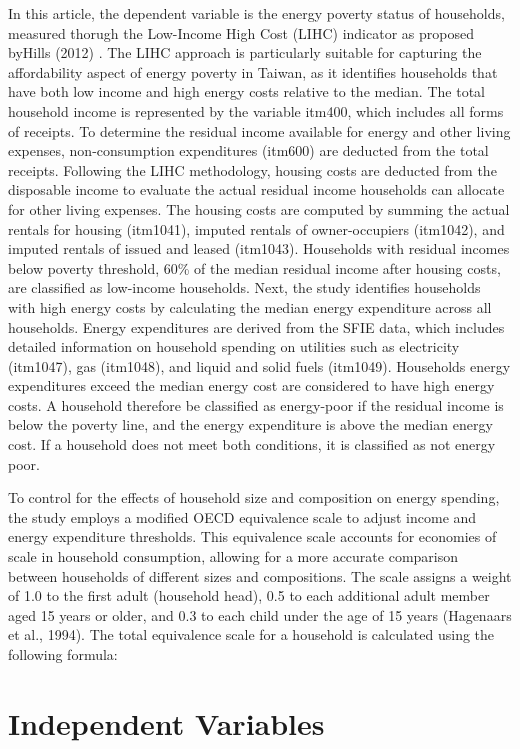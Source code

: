 \documentclass[
  twoside,
  openright,
  degree    = master,               %
  language  = english,              %
  fontset   = overleaf,             %
  watermark = true,                 %
  doi       = true,                 %
]{ntuthesis}
\begin{document}
In this article, the dependent variable is the energy poverty status of
households, measured thorugh the Low-Income High Cost (LIHC) indicator
as proposed byHills (2012) . The LIHC approach is particularly suitable
for capturing the affordability aspect of energy poverty in Taiwan, as
it identifies households that have both low income and high energy costs
relative to the median. The total household income is represented by the
variable itm400, which includes all forms of receipts. To determine the
residual income available for energy and other living expenses,
non-consumption expenditures (itm600) are deducted from the total
receipts. Following the LIHC methodology, housing costs are deducted
from the disposable income to evaluate the actual residual income
households can allocate for other living expenses. The housing costs are
computed by summing the actual rentals for housing (itm1041), imputed
rentals of owner-occupiers (itm1042), and imputed rentals of issued and
leased (itm1043). Households with residual incomes below poverty
threshold, 60\% of the median residual income after housing costs, are
classified as low-income households. Next, the study identifies
households with high energy costs by calculating the median energy
expenditure across all households. Energy expenditures are derived from
the SFIE data, which includes detailed information on household spending
on utilities such as electricity (itm1047), gas (itm1048), and liquid
and solid fuels (itm1049). Households energy expenditures exceed the
median energy cost are considered to have high energy costs. A household
therefore be classified as energy-poor if the residual income is below
the poverty line, and the energy expenditure is above the median energy
cost. If a household does not meet both conditions, it is classified as
not energy poor.

To control for the effects of household size and composition on energy
spending, the study employs a modified OECD equivalence scale to adjust
income and energy expenditure thresholds. This equivalence scale
accounts for economies of scale in household consumption, allowing for a
more accurate comparison between households of different sizes and
compositions. The scale assigns a weight of 1.0 to the first adult
(household head), 0.5 to each additional adult member aged 15 years or
older, and 0.3 to each child under the age of 15 years (Hagenaars et
al., 1994). The total equivalence scale for a household is calculated
using the following formula:

\hypertarget{independent-variables}{%
\section{Independent Variables}\label{independent-variables}}
\end{document}
